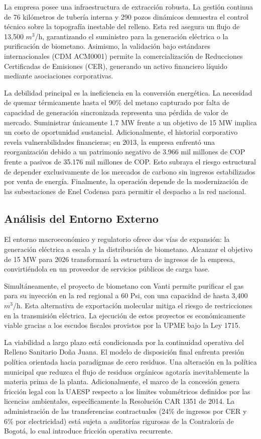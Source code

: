 \documentclass[11pt,letterpaper]{article}
\begin{document}
La empresa posee una infraestructura de extracción robusta. La gestión continua
de 76 kilómetros de tubería interna y 290 pozos dinámicos demuestra el control
técnico sobre la topografía inestable del relleno. Esta red asegura un flujo de
13,500 $m^3$/h, garantizando el suministro para la generación eléctrica o la
purificación de biometano. Asimismo, la validación bajo estándares
internacionales (CDM ACM0001) permite la comercialización de Reducciones
Certificadas de Emisiones (CER), generando un activo financiero líquido mediante
asociaciones corporativas.

La debilidad principal es la ineficiencia en la conversión energética. La
necesidad de quemar térmicamente hasta el 90\% del metano capturado por falta de
capacidad de generación sincronizada representa una pérdida de valor de mercado.
Suministrar únicamente 1.7 MW frente a un objetivo de 15 MW implica un costo de
oportunidad sustancial. Adicionalmente, el historial corporativo revela
vulnerabilidades financieras; en 2013, la empresa enfrentó una reorganización
debido a un patrimonio negativo de 3.966 mil millones de COP frente a pasivos de
35.176 mil millones de COP. Esto subraya el riesgo estructural de depender
exclusivamente de los mercados de carbono sin ingresos estabilizados por venta
de energía. Finalmente, la operación depende de la modernización de las
subestaciones de Enel Codensa para permitir el despacho a la red nacional.

\subsection{Análisis del Entorno Externo}

El entorno macroeconómico y regulatorio ofrece dos vías de expansión: la
generación eléctrica a escala y la distribución de biometano. Alcanzar el
objetivo de 15 MW para 2026 transformará la estructura de ingresos de la
empresa, convirtiéndola en un proveedor de servicios públicos de carga base.

Simultáneamente, el proyecto de biometano con Vanti permite purificar el gas
para su inyección en la red regional a 60 Psi, con una capacidad de hasta 3,400
$m^3$/h. Esta alternativa de exportación molecular mitiga el riesgo de
restricciones en la transmisión eléctrica. La ejecución de estos proyectos es
económicamente viable gracias a los escudos fiscales provistos por la UPME bajo
la Ley 1715.

La viabilidad a largo plazo está condicionada por la continuidad operativa del
Relleno Sanitario Doña Juana. El modelo de disposición final enfrenta presión
política orientada hacia paradigmas de cero residuos. Una alteración en la
política municipal que reduzca el flujo de residuos orgánicos agotaría
inevitablemente la materia prima de la planta. Adicionalmente, el marco de la
concesión genera fricción legal con la UAESP respecto a los límites volumétricos
definidos por las licencias ambientales, específicamente la Resolución CAR 1351
de 2014. La administración de las transferencias contractuales (24\% de ingresos
por CER y 6\% por electricidad) está sujeta a auditorías rigurosas de la
Contraloría de Bogotá, lo cual introduce fricción operativa recurrente.
\end{document}
